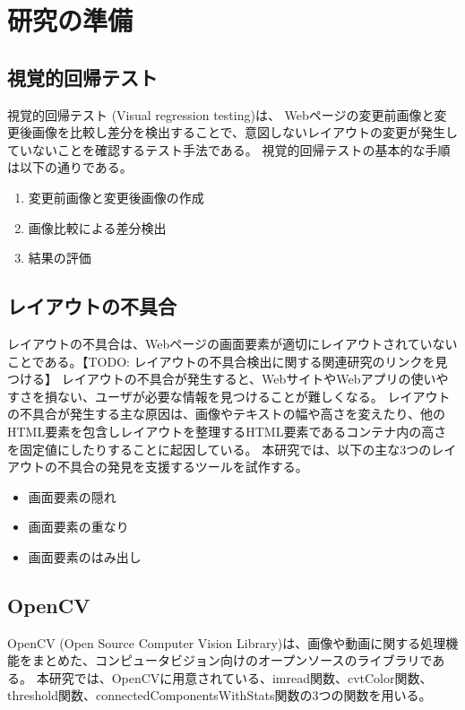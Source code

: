 \chapter{研究の準備}\label{cha:Preparation}

\section{視覚的回帰テスト}\label{sec:vrt}
視覚的回帰テスト (Visual regression testing)\cite{Visual regression testing}は、
Webページの変更前画像と変更後画像を比較し差分を検出することで、意図しないレイアウトの変更が発生していないことを確認するテスト手法である。
視覚的回帰テストの基本的な手順は以下の通りである。
\begin{enumerate}
    \setlength{\itemsep}{0pt}
          \setlength{\parsep}{0pt}
    \item 変更前画像と変更後画像の作成
    \item 画像比較による差分検出
    \item 結果の評価
\end{enumerate}

\section{レイアウトの不具合}\label{sec:layout effect}
レイアウトの不具合は、Webページの画面要素が適切にレイアウトされていないことである。【TODO: レイアウトの不具合検出に関する関連研究のリンクを見つける】
レイアウトの不具合が発生すると、WebサイトやWebアプリの使いやすさを損ない、ユーザが必要な情報を見つけることが難しくなる。
レイアウトの不具合が発生する主な原因は、画像やテキストの幅や高さを変えたり、他のHTML要素を包含しレイアウトを整理するHTML要素であるコンテナ内の高さを固定値にしたりすることに起因している。
本研究では、以下の主な3つのレイアウトの不具合の発見を支援するツールを試作する。
\begin{itemize}
    \setlength{\itemsep}{0pt}
          \setlength{\parsep}{0pt}
    \item 画面要素の隠れ
    \item 画面要素の重なり
    \item 画面要素のはみ出し
\end{itemize}

\section{OpenCV}
\label{sec:opencv}
OpenCV (Open Source Computer Vision Library)は、画像や動画に関する処理機能をまとめた、コンピュータビジョン向けのオープンソースのライブラリである\cite{OpenCV}。
本研究では、OpenCVに用意されている、imread関数、cvtColor関数、threshold関数、connectedComponentsWithStats関数の3つの関数を用いる。
